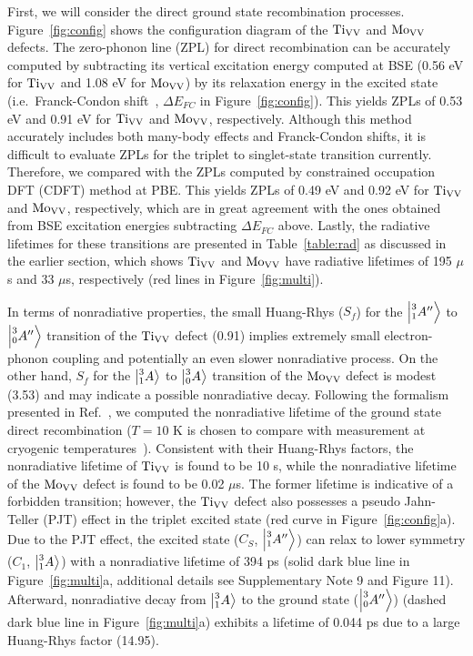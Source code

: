 First, we will consider the direct ground state recombination processes.
Figure~\ref{fig:config} shows the configuration diagram of the $\text{Ti}_{\text{V}\text{V}}$ and $\text{Mo}_{\text{V}\text{V}}$ defects.
The zero-phonon line (ZPL) for direct recombination can be accurately computed by subtracting its vertical excitation energy computed at BSE (0.56 eV for $\text{Ti}_{\text{V}\text{V}}$ and 1.08 eV for $\text{Mo}_{\text{V}\text{V}}$) by its relaxation energy in the excited state (i.e.\ Franck-Condon shift~\cite{van2004first}, $\Delta E_{FC}$ in Figure~\ref{fig:config}). This yields ZPLs of 0.53 eV and 0.91 eV for $\text{Ti}_{\text{V}\text{V}}$ and $\text{Mo}_{\text{V}\text{V}}$, respectively. Although this method accurately includes both many-body effects and Franck-Condon shifts, it is difficult to evaluate ZPLs for the triplet to singlet-state transition currently.
Therefore, we compared with the ZPLs computed by constrained occupation DFT (CDFT) method at PBE. This yields ZPLs of 0.49 eV and 0.92 eV for $\text{Ti}_{\text{V}\text{V}}$ and $\text{Mo}_{\text{V}\text{V}}$, respectively, which are in great agreement with the ones obtained from BSE excitation energies subtracting $\Delta E_{FC}$ above.
Lastly, the radiative lifetimes for these transitions are presented in Table~\ref{table:rad} as discussed in the earlier section, which shows $\text{Ti}_{\text{V}\text{V}}$ and $\text{Mo}_{\text{V}\text{V}}$ have radiative lifetimes of 195 $\mu$s and 33 $\mu$s, respectively (red lines in Figure~\ref{fig:multi}).

In terms of nonradiative properties, the small Huang-Rhys ($S_f$) for the $\ket{\prescript{3}{1}{A''}}$ to $\ket{\prescript{3}{0}{A''}}$ transition of the $\text{Ti}_{\text{V}\text{V}}$ defect (0.91) implies extremely small electron-phonon coupling and potentially an even slower nonradiative process.
On the other hand, $S_f$ for the $\ket{\prescript{3}{1}{A}}$ to $\ket{\prescript{3}{0}{A}}$ transition of the $\text{Mo}_{\text{V}\text{V}}$ defect is modest (3.53) and may indicate a possible nonradiative decay.
Following the formalism presented in Ref.~\cite{wu2019carrier}, we computed the nonradiative lifetime of the ground state direct recombination ($T=10$ K is chosen to compare with measurement at cryogenic temperatures~\cite{goldman2015phonon}). %
Consistent with their Huang-Rhys factors, the nonradiative lifetime of $\text{Ti}_{\text{V}\text{V}}$ is found to be 10 s, while the nonradiative lifetime of the $\text{Mo}_{\text{V}\text{V}}$ defect is found to be 0.02 $\mu$s.
The former lifetime is indicative of a forbidden transition; however, the $\text{Ti}_{\text{V}\text{V}}$ defect also possesses a pseudo Jahn-Teller (PJT) effect in the triplet excited state (red curve in Figure~\ref{fig:config}a).
Due to the PJT effect, the excited state ($C_S$, $\ket{\prescript{3}{1}{A''}}$) can relax to lower symmetry ($C_1$, $\ket{\prescript{3}{1}{A}}$) with a nonradiative lifetime of 394 ps (solid dark blue line in Figure~\ref{fig:multi}a, additional details see Supplementary Note 9 and Figure 11). Afterward, nonradiative decay from $\ket{\prescript{3}{1}{A}}$ to the ground state ($\ket{\prescript{3}{0}{A''}}$) (dashed dark blue line in Figure~\ref{fig:multi}a) exhibits a lifetime of 0.044 ps due to a large Huang-Rhys factor (14.95).



